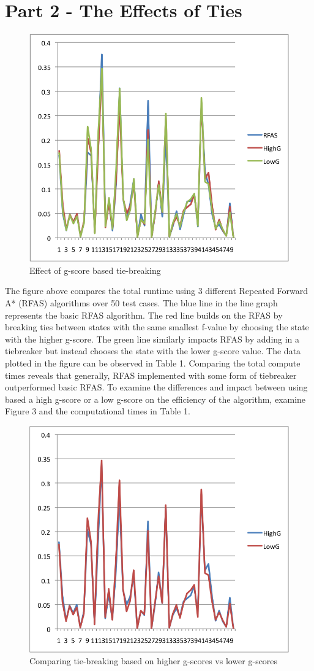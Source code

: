\documentclass[12pt]{article}
\begin{document}
	\section*{Part 2 - The Effects of Ties}
		\begin{figure}[!htb]
			\centering
			\includegraphics[width=.5\textwidth]{rfas_high_low.png}
			\caption{Effect of g-score based tie-breaking}
		\end{figure}
		The figure above compares the total runtime using 3 different Repeated Forward A* (RFAS) algorithms over 50 test cases. The blue line in the line graph represents the basic RFAS algorithm.  The red line builds on the RFAS by breaking ties between states with the same smallest f-value by choosing the state with the higher g-score.  The green line similarly impacts RFAS by adding in a tiebreaker but instead chooses the state with the lower g-score value.  The data plotted in the figure can be observed in Table 1.  Comparing the total compute times reveals that generally, RFAS implemented with some form of tiebreaker outperformed basic RFAS.  To examine the differences and impact between using based a high g-score or a low g-score on the efficiency of the algorithm, examine Figure 3 and the computational times in Table 1.  
		\begin{figure}[!htb]
			\centering
			\includegraphics[width=.5\textwidth]{low_high.png}
			\caption{Comparing tie-breaking based on higher g-scores vs lower g-scores}
		\end{figure}
\end{document}
